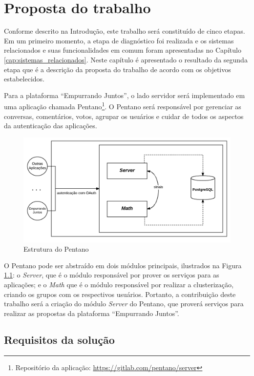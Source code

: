 \chapter{Proposta do trabalho} \label{cap:proposta}

Conforme descrito na Introdução, este trabalho será constituído de cinco etapas.
Em um primeiro momento, a etapa de diagnóstico foi realizada e os sistemas relacionados e suas funcionalidades em comum 
foram apresentadas no Capítulo \ref{cap:sistemas_relacionados}. Neste capítulo é apresentado o resultado da segunda etapa
que é a descrição da proposta do trabalho de acordo com os objetivos estabelecidos.

Para a plataforma ``Empurrando Juntos'', o lado servidor será implementado em uma aplicação chamada Pentano\footnote{Repositório da aplicação: \url{https://gitlab.com/pentano/server}}.
O Pentano será responsável por gerenciar as conversas, comentários, votos, agrupar os usuários
e cuidar de todos os aspectos da autenticação das aplicações.

\begin{figure}[h!]
\centering
\includegraphics[scale=0.45]{figuras/esquema_pentano.png}
\caption{Estrutura do Pentano}
\label{fig:pentano}
\end{figure}

O Pentano pode ser abstraído em dois módulos principais, ilustrados na Figura \ref{fig:pentano}: o \textit{Server}, 
que é o módulo responsável por prover os serviços para as aplicações; e o \textit{Math} que é o módulo responsável por realizar
a clusterização, criando os grupos com os respectivos usuários.
Portanto, a contribuição deste trabalho será a criação do módulo \textit{Server} do Pentano, que proverá serviços para realizar as
propostas da plataforma ``Empurrando Juntos''.

\section{Requisitos da solução} \label{sec:requisitos}

